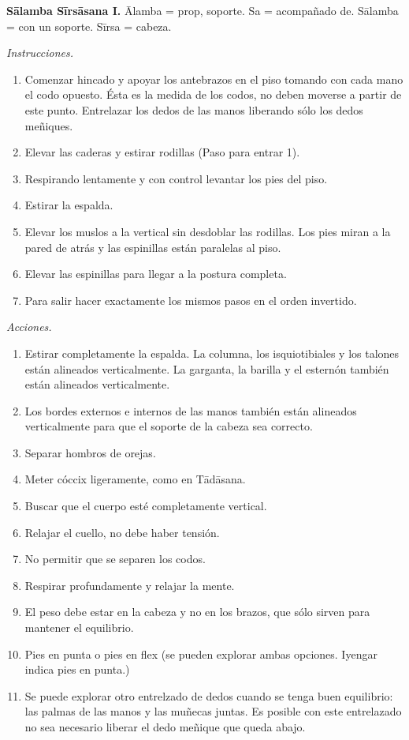 \medskip\noindent\textbf{Sālamba Sīrsāsana
I.}
Ālamba = prop, soporte. Sa = acompañado de.
Sālamba = con un soporte. Sīrsa = cabeza.

\emph{Instrucciones.}
\begin{enumerate}
\item Comenzar hincado y apoyar los
antebrazos en el piso tomando con cada mano
el codo opuesto. Ésta es la medida de los
codos, no deben moverse a partir de este
punto. Entrelazar los dedos de las manos
liberando sólo los dedos meñiques.
\item Elevar las caderas y estirar rodillas
(Paso para entrar 1).
\item Respirando lentamente y con control
levantar los pies del piso.
\item Estirar la espalda.
\item Elevar los muslos a la vertical sin
desdoblar las rodillas. Los pies miran a la
pared de atrás y las espinillas están
paralelas al piso.
\item Elevar las espinillas para llegar a la
postura completa.
\item Para salir hacer exactamente los mismos
pasos en el orden invertido.
\end{enumerate}

\emph{Acciones.}
\begin{enumerate}
\item Estirar completamente la espalda. La
columna, los isquiotibiales y los talones
están alineados verticalmente. La garganta,
la barilla y el esternón también están
alineados verticalmente.
\item Los bordes externos e internos de las
manos también están alineados verticalmente
para que el soporte de la cabeza sea
correcto.
\item Separar hombros de orejas.
\item Meter cóccix ligeramente, como en
Tādāsana.
\item Buscar que el cuerpo esté completamente
vertical.
\item Relajar el cuello, no debe haber
tensión.
\item No permitir que se separen los codos.
\item Respirar profundamente y relajar la
mente.
\item El peso debe estar en la cabeza y no en
los brazos, que sólo sirven para mantener el
equilibrio.
\item Pies en punta o pies en flex (se pueden
explorar ambas opciones. Iyengar indica pies
en punta.)
\item Se puede explorar otro entrelzado de
dedos cuando se tenga buen equilibrio: las
palmas de las manos y las muñecas juntas. Es
posible con este entrelazado no sea necesario
liberar el dedo meñique que queda abajo.
\end{enumerate}

